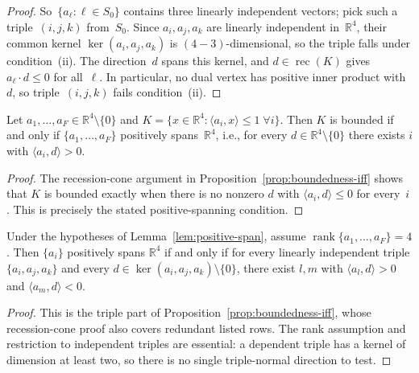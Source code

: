 \begin{unverified}
\begin{proof}
So~$\{a_\ell : \ell \in S_0\}$ contains three linearly independent vectors;
pick such a triple~$(i,j,k)$ from~$S_0$.  Since $a_i, a_j, a_k$ are linearly
independent in~$\mathbb{R}^4$, their common kernel $\ker(a_i, a_j, a_k)$ is
$(4 - 3)$-dimensional, so the triple falls under condition~\textup{(ii)}.
The direction~$d$ spans this kernel, and $d \in \operatorname{rec}(K)$ gives
$a_\ell \cdot d \le 0$ for all~$\ell$.  In particular, no dual vertex has positive
inner product with~$d$, so triple~$(i,j,k)$ fails condition~\textup{(ii)}.
\end{proof}
\end{unverified}

\begin{unverified}
\begin{lemma}\label{lem:positive-span}
Let $a_1, \ldots, a_F \in \mathbb{R}^4 \setminus \{0\}$ and
$K = \{x \in \mathbb{R}^4 : \langle a_i, x \rangle \leq 1 \;\forall i\}$.
Then $K$ is bounded if and only if $\{a_1, \ldots, a_F\}$ positively
spans~$\mathbb{R}^4$, i.e., for every $d \in \mathbb{R}^4 \setminus \{0\}$
there exists $i$ with $\langle a_i, d \rangle > 0$.
\end{lemma}

\begin{proof}
The recession-cone argument in Proposition~\ref{prop:boundedness-iff} shows
that $K$ is bounded exactly when there is no nonzero $d$ with
$\langle a_i,d\rangle\leq 0$ for every~$i$.  This is precisely the stated
positive-spanning condition.
\end{proof}
\end{unverified}


\begin{unverified}
\begin{lemma}\label{lem:bounded-triples}
Under the hypotheses of Lemma~\ref{lem:positive-span}, assume
$\operatorname{rank}\{a_1, \ldots, a_F\} = 4$.
Then $\{a_i\}$ positively spans $\mathbb{R}^4$ if and only if for every
linearly independent triple $\{a_i,a_j,a_k\}$ and every
$d \in \ker(a_i, a_j, a_k) \setminus \{0\}$, there exist $l, m$ with
$\langle a_l, d \rangle > 0$ and $\langle a_m, d \rangle < 0$.
\end{lemma}

\begin{proof}
This is the triple part of Proposition~\ref{prop:boundedness-iff}, whose
recession-cone proof also covers redundant listed rows.  The rank assumption
and restriction to independent triples are essential: a dependent triple has
a kernel of dimension at least two, so there is no single triple-normal
direction to test.
\end{proof}
\end{unverified}


